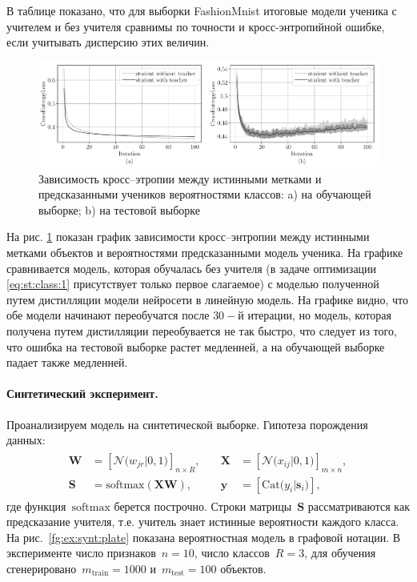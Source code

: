 В таблице показано, что для выборки FashionMnist итоговые модели ученика с учителем и без учителя сравнимы по точности и кросс-энтропийной ошибке, если учитывать дисперсию этих величин.

\begin{figure}[h!t]\center
\includegraphics[width=1\textwidth]{results/privlearn/mnist_loss}
\caption{Зависимость кросс--этропии между истинными метками и предсказанными учеников вероятностями классов: a) на обучающей выборке; b) на тестовой выборке}
\label{fg:ex:fashionmnist:loss}
\end{figure}

На рис. \ref{fg:ex:fashionmnist:loss} показан график зависимости кросс--энтропии между истинными метками объектов и вероятностями предсказанными модель ученика. На графике сравнивается модель, которая обучалась без учителя (в задаче оптимизации \eqref{eq:st:class:1} присутствует только первое слагаемое) с моделью полученной путем дистилляции модели нейросети в линейную модель. На графике видно, что обе модели начинают переобучатся после $30-$й итерации, но модель, которая получена путем дистилляции переобувается не так быстро, что следует из того, что ошибка на тестовой выборке растет медленней, а на обучающей выборке падает также медленней.


\paragraph{Синтетический эксперимент.} Проанализируем модель на синтетической выборке. Гипотеза порождения данных:
\begin{gather}
\begin{aligned}
\mathbf{W} &= \left[\mathcal{N}\bigr(w_{jr}|0, 1\bigr)\right]_{n\times R}, \quad &\mathbf{X} &= \left[\mathcal{N}\bigr(x_{ij}|0, 1\bigr)\right]_{m\times n}, \\
 \mathbf{S} &= \text{softmax}\left(\mathbf{XW}\right), \quad &\mathbf{y} &= \left[\text{Cat}\bigr(y_i| \mathbf{s}_i\bigr)\right],
\end{aligned}
\end{gather}
где функция~$\text{softmax}$ берется построчно. Строки матрицы~$\mathbf{S}$ рассматриваются как предсказание учителя, т.е. учитель знает истинные вероятности каждого класса. На рис.~\ref{fg:ex:synt:plate} показана вероятностная модель в графовой нотации. В эксперименте число признаков~$n=10$, число классов~$R=3$, для обучения сгенерировано~$m_{\text{train}}=1000$ и~$m_{\text{test}}=100$ объектов.

